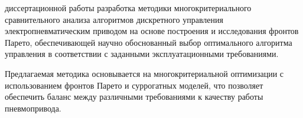 
{\actuality}

\ifsynopsis

\else

\fi


{\aim} 
диссертационной работы
разработка методики многокритериального сравнительного анализа алгоритмов дискретного
управления электропневматическим приводом на основе построения и
исследования фронтов Парето, обеспечивающей научно обоснованный выбор
оптимального алгоритма управления в соответствии с заданными эксплуатационными требованиями.

Предлагаемая методика основывается на многокритериальной оптимизации с использованием фронтов Парето
и суррогатных моделей, что позволяет обеспечить баланс между различными требованиями к качеству работы пневмопривода.

